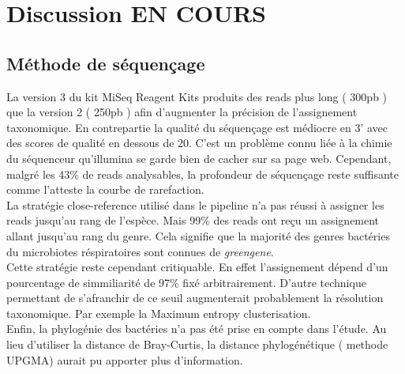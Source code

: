 \documentclass[12pt,a4paper]{article}
\begin{document}
\section{Discussion EN COURS}
\subsection{Méthode de séquençage}
La version 3 du kit MiSeq Reagent Kits produits des reads plus long ( 300pb ) que la version 2 ( 250pb ) afin d’augmenter la précision de l’assignement taxonomique. En contrepartie la qualité du séquençage est médiocre en 3’ avec des scores de qualité en dessous de 20. C’est un problème connu liée à la chimie du séquenceur qu’illumina se garde bien de cacher sur sa page web. Cependant, malgré les 43\% de reads analysables, la profondeur de séquençage reste suffisante comme l’atteste la courbe de rarefaction. \\
La stratégie close-reference utilisé dans le pipeline n'a pas réussi à assigner les reads jusqu'au rang de l'espèce. Mais 99\% des reads ont reçu un assignement allant jusqu'au rang du genre. Cela signifie que la majorité des genres bactéries du microbiotes réspiratoires sont connues de \textit{greengene}. \\
Cette stratégie reste cependant critiquable. En effet l'assignement dépend d’un pourcentage de simmiliarité de 97\% fixé arbitrairement. D’autre technique permettant de s’afranchir de ce seuil augmenterait probablement la résolution taxonomique. Par exemple la  Maximum entropy clusterisation. \\
Enfin, la phylogénie des bactéries n’a pas été prise en compte dans l’étude. Au lieu d'utiliser la distance de Bray-Curtis, la distance phylogénétique ( methode UPGMA) aurait pu apporter plus d'information. 
\end{document}
